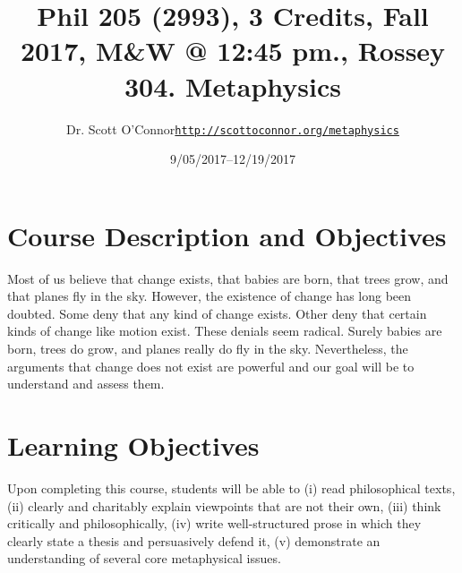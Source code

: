 \documentclass[article,oneside]{memoir}
\makeatletter
\def\myauthor{Author}
\def\mytitle{Title}
\def\mycopyright{\myauthor}
\def\myweb{\href{http://scottoconnor.org/metaphysics}{http://scottoconnor.org/metaphysics}}
\def\myauthor{Dr. Scott O'Connor}
\def\mytitle{{\normalsize Phil 205 (2993), 3 Credits, Fall 2017, M\&W @ 12:45 pm., Rossey 304. \newline} \HUGE Metaphysics}
\makeatother
\begin{document}
\setsansfont[Mapping=tex-text]{Georgia} 
\setmonofont[Mapping=tex-text,Scale=0.8]{Georgia} 

\def\ind{\hangindent=1 true cm\hangafter=1 \noindent}
\def\labelitemi{$\cdot$}

\pagestyle{kjh}

\title{\LARGE\mytitle}     
\author{\Large\myauthor \newline \footnotesize\texttt{\noindent\myweb}}
\date{9/05/2017--12/19/2017}

\published{\,}

\maketitle




%
%

\section{Course Description and Objectives}

Most of us believe that change exists, that babies are born, that trees grow, and that planes fly in the sky. However, the existence of change has long been doubted. Some deny that any kind of change exists. Other deny that certain kinds of change like motion exist. These denials seem radical. Surely babies are born, trees do grow, and planes really do fly in the sky. Nevertheless, the arguments that change does not exist are powerful and our goal will be to understand and assess them. 


\section{Learning Objectives}

Upon completing this course, students will be able to (i) read
philosophical texts, (ii) clearly and charitably explain viewpoints that
are not their own, (iii) think critically and philosophically, (iv)
write well-structured prose in which they clearly state a thesis and
persuasively defend it, (v) demonstrate an understanding of several core
metaphysical issues.
\end{document}
